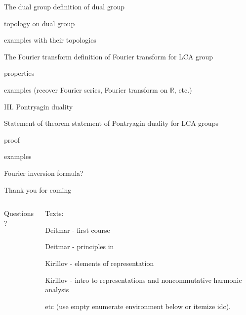 \documentclass[mathserif
]{beamer}
\begin{document}
\begin{frame}{The dual group}
    definition of dual group

    topology on dual group

    examples with their topologies
\end{frame}

\begin{frame}{The Fourier transform}
    definition of Fourier transform for LCA group

    properties

    examples (recover Fourier series, Fourier transform on $\mathbb{R}$, etc.)
\end{frame}

\begin{frame}{}
    \begin{block}{}{
        \begin{center}\Large III. Pontryagin duality\end{center}}
    \end{block}
\end{frame}

\begin{frame}{Statement of theorem}
    statement of Pontryagin duality for LCA groups

    proof

    examples

    Fourier inversion formula?
\end{frame}

\begin{frame}{Thank you for coming}
    \begin{columns}
    \begin{column}{0.5\textwidth}
        \begin{block}{}{
        \begin{center}\Large  Questions?\end{center}}
        \end{block}\vspace{15.5em}
    \end{column}
    \begin{column}{0.5\textwidth}
        \begin{block}{}{
        \begin{center}\Large  Texts:\end{center}}
    \end{block}

    Deitmar - first course

    Deitmar - principles in

    Kirillov - elements of representation

    Kirillov - intro to representations and noncommutative harmonic analysis

    etc (use empty enumerate environment below or itemize idc).
    \end{column}
    \end{columns}
\end{frame}

\end{document}
